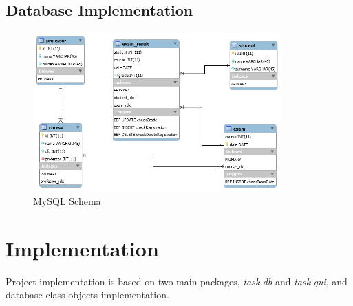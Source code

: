 \documentclass{report}
\begin{document}
\section*{Database Implementation}
\begin{figure}[ht]
	\includegraphics[width=0.85\textwidth]{mysqlSchema.png}
	\caption{MySQL Schema}
\end{figure}


\chapter*{Implementation}
Project implementation is based on two main packages, \textit{task.db} and \textit{task.gui}, and database class objects implementation.
\end{document}
